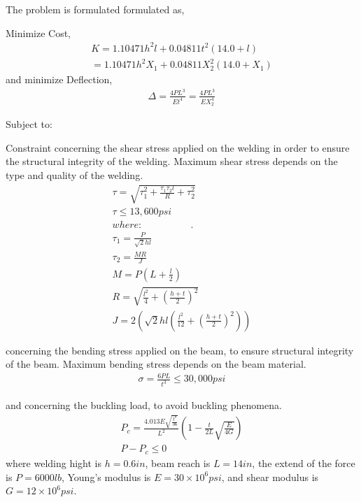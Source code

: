 
The problem is formulated formulated as,

Minimize Cost,
\begin{eqnarray}\nonumber
   K = 1.10471h^2l+0.04811t^2(14.0+l) \\
   = 1.10471h^2X_1+0.04811X_2^2(14.0+X_1)
   \label{Cost} 
\end{eqnarray}
and minimize Deflection,
\begin{eqnarray}
   \Delta = \frac{4PL^3}{Et^4} = \frac{4PL^3}{EX_2^4}
   \label{Deflection} 
\end{eqnarray}

Subject to:


Constraint concerning the shear stress applied on the welding in order to ensure the structural integrity of the welding. Maximum shear stress depends on the type and quality of the welding. 
\begin{eqnarray}
   \tau = \sqrt{\tau_1^2 + \frac{\tau_1 \tau_2 l}{R} +\tau_2^2} \\
   \nonumber \tau \leq 13,600 psi \\
   \nonumber where:~~~~~~~~~~~~~~~~~~~~~~.\\
   \nonumber \tau_1 = \frac{P}{\sqrt{2}hl} \\
   \nonumber \tau_2 = \frac{MR}{J} \\   
   \nonumber M = P(L+\frac{l}{2}) \\ 
   \nonumber R = \sqrt{\frac{l^2}{4} + (\frac{h+t}{2})^2} \\
   \nonumber J = 2\left( \sqrt{2}hl\left( \frac{l^2}{12} + \left(\frac{h+t}{2}\right)^2 \right) \right)
   \label{shear} 
\end{eqnarray}

concerning the bending stress applied on the beam, to ensure structural integrity of the beam. Maximum bending stress depends on the beam material.
\begin{eqnarray}
   \sigma = \frac{6PL}{t^3} \leq 30,000 psi
   \label{bend} 
\end{eqnarray}

and concerning the buckling load, to avoid buckling phenomena.  
\begin{eqnarray}
   P_c = \frac{4.013E\sqrt{\frac{t^8}{36}}}{L^2}\left( 1- \frac{t}{2L}\sqrt{\frac{E}{4G}} \right) \\
   \nonumber  P - P_c \leq 0 
   \label{back} 
\end{eqnarray}
where welding hight is $h = 0.6 in$, beam reach is $L = 14 in$, the extend of the force is $P = 6000 lb$, Young’s modulus is $E = 30 \times 10^6 psi$, and shear modulus is $G = 12 \times 10^6 psi$.  

